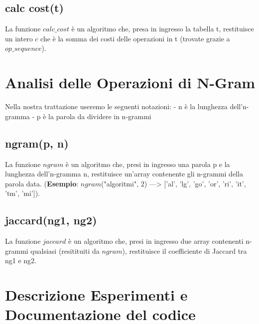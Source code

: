 \documentclass[a4paper,12pt]{article}
\begin{document}
\subsection{calc cost(t)}
La funzione $calc\_cost$ è un algoritmo che, presa in ingresso la tabella t, restituisce un intero $c$ che è la somma dei costi delle operazioni in t (trovate grazie a $op\_sequence$).

\section{Analisi delle Operazioni di N-Gram}
Nella nostra trattazione useremo le seguenti notazioni:
\newline
- n è la lunghezza dell'n-gramma \newline
- p è la parola da dividere in n-grammi

\subsection{ngram(p, n)}
La funzione $ngram$ è un algoritmo che, presi in ingresso una parola p e la lunghezza dell'n-gramma n, restituisce un'array contenente gli n-grammi della parola data. (\textbf{Esempio}: $ngram$("algoritmi", 2) ---> ['al', 'lg', 'go', 'or', 'ri', 'it', 'tm', 'mi']).

\subsection{jaccard(ng1, ng2)}
La funzione $jaccard$ è un algoritmo che, presi in ingresso due array contenenti n-grammi qualsiasi (resitituiti da $ngram$), restituisce il coefficiente di Jaccard tra ng1 e ng2.

\clearpage
\section{Descrizione Esperimenti e Documentazione del codice}
\end{document}
